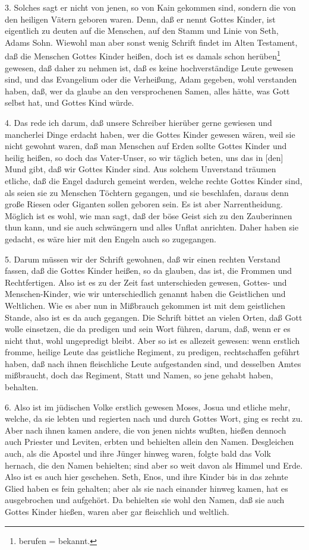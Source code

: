 3. Solches sagt er nicht von jenen, so von Kain gekommen sind, sondern die von den heiligen Vätern geboren waren. Denn, daß er nennt Gottes Kinder, ist eigentlich zu deuten auf die Menschen, auf den Stamm und Linie von Seth, Adams Sohn. Wiewohl man aber sonst wenig Schrift findet im Alten Testament, daß die Menschen Gottes Kinder heißen, doch ist es damals schon herüben\footnote{berufen = bekannt.} gewesen, daß daher zu nehmen ist, daß es keine hochverständige Leute gewesen sind, und das Evangelium oder die Verheißung, Adam gegeben, wohl verstanden haben, daß, wer da glaube an den versprochenen Samen, alles hätte, was Gott selbst hat, und Gottes Kind würde.

4. Das rede ich darum, daß unsere Schreiber hierüber gerne gewiesen und mancherlei Dinge erdacht haben, wer die Gottes Kinder gewesen wären, weil sie nicht gewohnt waren, daß man Menschen auf Erden sollte Gottes Kinder und heilig heißen, so doch das Vater-Unser, so wir täglich beten, uns das in [den] Mund gibt, daß wir Gottes Kinder sind. Aus solchem Unverstand träumen etliche, daß die Engel dadurch gemeint werden, welche rechte Gottes Kinder sind, als seien sie zu Menschen Töchtern gegangen, und sie beschlafen, daraus denn große Riesen oder Giganten sollen geboren sein. Es ist aber Narrentheidung. Möglich ist es wohl, wie man sagt, daß der böse Geist sich zu den Zauberinnen thun kann, und sie auch schwängern und alles Unflat anrichten. Daher haben sie gedacht, es wäre hier mit den Engeln auch so zugegangen.

5. Darum müssen wir der Schrift gewohnen, daß wir einen rechten Verstand fassen, daß die Gottes Kinder heißen, so da glauben, das ist, die Frommen und Rechtfertigen. Also ist es zu der Zeit fast unterschieden gewesen, Gottes- und Menschen-Kinder, wie wir unterschiedlich genannt haben die Geistlichen und Weltlichen. Wie es aber nun in Mißbrauch gekommen ist mit dem geistlichen Stande, also ist es da auch gegangen. Die Schrift bittet an vielen Orten, daß Gott wolle einsetzen, die da predigen und sein Wort führen, darum, daß, wenn er es nicht thut, wohl ungepredigt bleibt. Aber so ist es allezeit gewesen: wenn erstlich fromme, heilige Leute das geistliche Regiment, zu predigen, rechtschaffen geführt haben, daß nach ihnen fleischliche Leute aufgestanden sind, und desselben Amtes mißbraucht, doch das Regiment, Statt und Namen, so jene gehabt haben, behalten.

6. Also ist im jüdischen Volke erstlich gewesen Moses, Josua und etliche mehr, welche, da sie lebten und regierten nach und durch Gottes Wort, ging es recht zu. Aber nach ihnen kamen andere, die von jenen nichts wußten, hießen dennoch auch Priester und Leviten, erbten und behielten allein den Namen. Desgleichen auch, als die Apostel und ihre Jünger hinweg waren, folgte bald das Volk hernach, die den Namen behielten; sind aber so weit davon als Himmel und Erde. Also ist es auch hier geschehen. Seth, Enos, und ihre Kinder bis in das zehnte Glied haben es fein gehalten; aber als sie nach einander hinweg kamen, hat es ausgebrochen und aufgehört. Da behielten sie wohl den Namen, daß sie auch Gottes Kinder hießen, waren aber gar fleischlich und weltlich.

